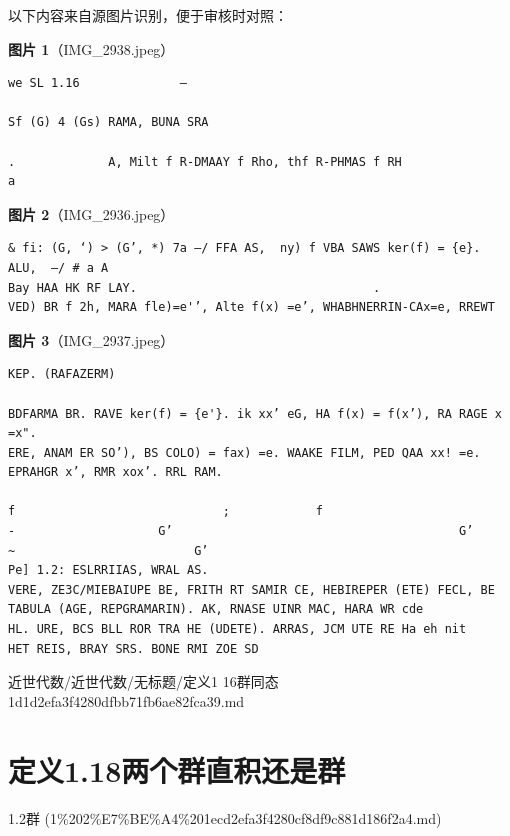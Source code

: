 \begin{note}
以下内容来自源图片识别，便于审核时对照：

\textbf{图片 1}（IMG\_2938.jpeg）
\begin{Verbatim}[fontsize=\small]
we SL 1.16              —

Sf (G) 4 (Gs) RAMA, BUNA SRA

.             A, Milt f R-DMAAY f Rho, thf R-PHMAS f RH
a
\end{Verbatim}

\textbf{图片 2}（IMG\_2936.jpeg）
\begin{Verbatim}[fontsize=\small]
& fi: (G, ‘) > (G’, *) 7a —/ FFA AS,  ny) f VBA SAWS ker(f) = {e}. ALU,  —/ # a A
Bay HAA HK RF LAY.                                 .
VED) BR f 2h, MARA fle)=e'’, Alte f(x) =e’, WHABHNERRIN-CAx=e, RREWT
\end{Verbatim}

\textbf{图片 3}（IMG\_2937.jpeg）
\begin{Verbatim}[fontsize=\small]
KEP. (RAFAZERM)

BDFARMA BR. RAVE ker(f) = {e'}. ik xx’ eG, HA f(x) = f(x’), RA RAGE x =x".
ERE, ANAM ER SO’), BS COLO) = fax) =e. WAAKE FILM, PED QAA xx! =e.
EPRAHGR x’, RMR xox’. RRL RAM.

f                             ;            f
-                    G’                                        G’               ~                         G’
Pe] 1.2: ESLRRIIAS, WRAL AS.
VERE, ZE3C/MIEBAIUPE BE, FRITH RT SAMIR CE, HEBIREPER (ETE) FECL, BE
TABULA (AGE, REPGRAMARIN). AK, RNASE UINR MAC, HARA WR cde
HL. URE, BCS BLL ROR TRA HE (UDETE). ARRAS, JCM UTE RE Ha eh nit
HET REIS, BRAY SRS. BONE RMI ZOE SD
\end{Verbatim}

\end{note}

\begin{note}[来源路径]

近世代数/近世代数/无标题/定义1 16群同态 1d1d2efa3f4280dfbb71fb6ae82fca39.md

\end{note}

\section*{定义1.18两个群直积还是群}

\begin{note}[来源上级主题]

1.2群 (1\%202\%E7\%BE\%A4\%201ecd2efa3f4280cf8df9c881d186f2a4.md)

\end{note}

